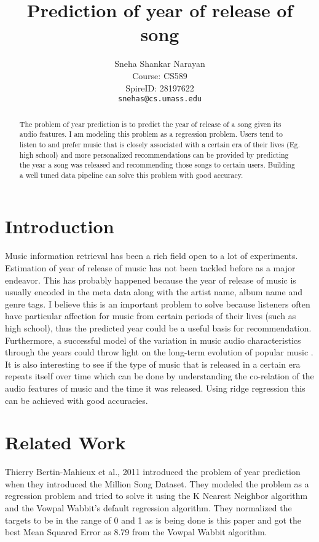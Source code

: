 \documentclass{article} %
\title{Prediction of year of release of song}
\author{
	Sneha Shankar Narayan\\
	Course: CS589 \\
	SpireID: 28197622\\
	\texttt{snehas@cs.umass.edu} \\
}
\begin{document}
\maketitle

\begin{abstract}
The problem of year prediction is to predict the year of release of a song given its audio features. I am modeling this problem as a regression problem. Users tend to listen to and prefer music that is closely associated with a certain era of their lives (Eg. high school) and more personalized recommendations can be provided by predicting the year a song was released and recommending those songs to certain users. Building a well tuned data pipeline can solve this problem with good accuracy.
\end{abstract}

\section{Introduction}
Music information retrieval has been a rich field open to a lot of experiments. Estimation of year of release of music has not been tackled before as a major endeavor.  This has probably happened because the year of release of music is usually encoded in the meta data along with the artist name, album name and genre tags. I believe this is an important problem to solve because listeners often have particular affection for music from certain periods of their lives (such as high school), thus the predicted year could be a useful basis for recommendation. Furthermore, a successful model of the variation in music audio characteristics through the years could throw light on the long-term evolution of popular music \cite{msd_11}. It is also interesting to see if the type of music that is released in a certain era repeats itself over time which can be done by understanding the co-relation of the audio features of music and the time it was released. Using ridge regression this can be achieved with good accuracies. 

\section{Related Work}
Thierry Bertin-Mahieux et al., 2011 \cite{msd_11} introduced the problem of year prediction when they introduced the Million Song Dataset. They modeled the problem as a regression problem and tried to solve it using the K Nearest Neighbor algorithm and the Vowpal Wabbit's default regression algorithm. They normalized the targets to be in the range of 0 and 1 as is being done is this paper and got the best Mean Squared Error as 8.79 from the Vowpal Wabbit algorithm. 
\end{document}
